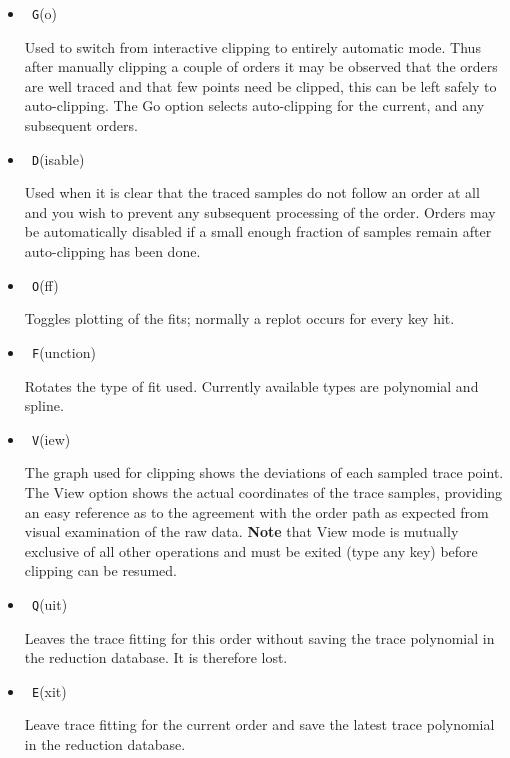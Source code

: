 \documentclass[twoside,11pt]{article}
\renewcommand{\_}{\texttt{\symbol{95}}}
\newcommand{\sunspec}[2]{#1}
\newcommand{\sunspec}[2]{#2}
\begin{document}
\begin{itemize}
\item {\sunspec{\Large\tt}{\bf} G}(o)

     Used to switch from interactive clipping to entirely
     automatic mode. Thus after manually clipping a couple of orders
     it may be observed that the orders are well traced and that few
     points need be clipped, this can be left safely to auto-clipping.
     The Go option selects auto-clipping for the current, and any
     subsequent orders.

\item {\sunspec{\Large\tt}{\bf} D}(isable)

     Used when it is clear that the traced samples do not
     follow an order at all and you wish to prevent any subsequent
     processing of the order.  Orders may be automatically disabled
     if a small enough fraction of samples remain after auto-clipping
     has been done.

\item {\sunspec{\Large\tt}{\bf} O}(ff)

     Toggles plotting of the fits; normally a replot occurs for every
     key hit.

\item {\sunspec{\Large\tt}{\bf} F}(unction)

     Rotates the type of fit used.  Currently available types
     are polynomial and spline.

\item {\sunspec{\Large\tt}{\bf} V}(iew)

     The graph used for clipping shows the deviations of each
     sampled trace point. The View option shows the actual coordinates
     of the trace samples, providing an easy reference as to the agreement
     with the order path as expected from visual examination of the raw data.
     {\bf Note} that View mode is mutually exclusive of all other operations
     and must be exited (type any key) before clipping can be resumed.

\item {\sunspec{\Large\tt}{\bf} Q}(uit)

     Leaves the trace fitting for this order without saving
     the trace polynomial in the reduction database. It is therefore
     lost.

\item {\sunspec{\Large\tt}{\bf} E}(xit)

     Leave trace fitting for the current order and save the
     latest trace polynomial in the reduction database.


\end{itemize}
\end{document}
